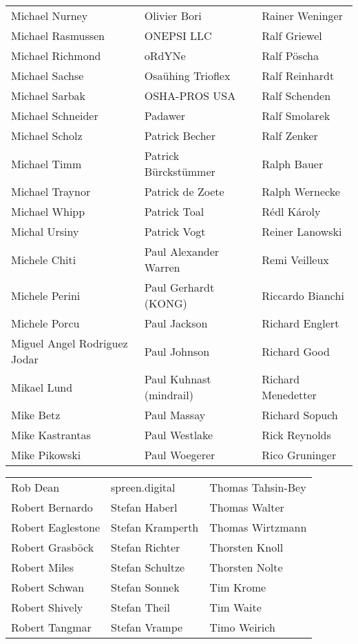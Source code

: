 \begin{small}
\begin{tabular}{p{4cm}p{4cm}p{4cm}}
Michael Nurney & Olivier Bori & Rainer Weninger \\
Michael Rasmussen & ONEPSI LLC & Ralf Griewel \\
Michael Richmond & oRdYNe & Ralf Pöscha \\
Michael Sachse & Osaühing Trioflex & Ralf Reinhardt \\
Michael Sarbak & OSHA-PROS USA & Ralf Schenden \\
Michael Schneider & Padawer & Ralf Smolarek \\
Michael Scholz & Patrick Becher & Ralf Zenker \\
Michael Timm & Patrick Bürckstümmer & Ralph Bauer \\
Michael Traynor & Patrick de Zoete & Ralph Wernecke \\
Michael Whipp & Patrick Toal & Rédl Károly \\
Michal Ursiny & Patrick Vogt & Reiner Lanowski \\
Michele Chiti & Paul Alexander Warren & Remi Veilleux \\
Michele Perini & Paul Gerhardt (KONG) & Riccardo Bianchi \\
Michele Porcu & Paul Jackson & Richard Englert \\
Miguel Angel Rodriguez Jodar & Paul Johnson & Richard Good \\
Mikael Lund & Paul Kuhnast (mindrail) & Richard Menedetter \\
Mike Betz & Paul Massay & Richard Sopuch \\
Mike Kastrantas & Paul Westlake & Rick Reynolds \\
Mike Pikowski & Paul Woegerer & Rico Gruninger \\
\end{tabular}
\newpage
\setlength{\tabcolsep}{1mm}
\begin{tabular}{p{4cm}p{4cm}p{4cm}}
Rob Dean & spreen.digital & Thomas Tahsin-Bey \\
Robert Bernardo & Stefan Haberl & Thomas Walter \\
Robert Eaglestone & Stefan Kramperth & Thomas Wirtzmann \\
Robert Grasböck & Stefan Richter & Thorsten Knoll \\
Robert Miles & Stefan Schultze & Thorsten Nolte \\
Robert Schwan & Stefan Sonnek & Tim Krome \\
Robert Shively & Stefan Theil & Tim Waite \\
Robert Tangmar & Stefan Vrampe & Timo Weirich \\

\end{tabular}
\end{small}
